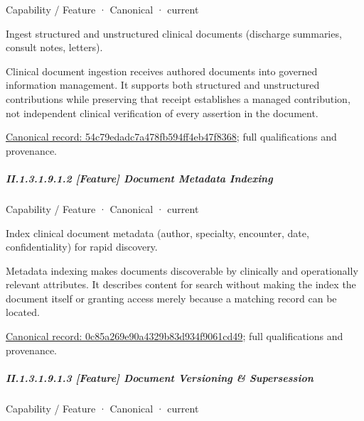 \label{element:54c79edadc7a478fb594ff4eb47f8368}
{\small Capability / Feature · Canonical · current}\par

Ingest structured and unstructured clinical documents (discharge summaries, consult notes, letters).



Clinical document ingestion receives authored documents into governed information management. It supports both structured and unstructured contributions while preserving that receipt establishes a managed contribution, not independent clinical verification of every assertion in the document.


{\footnotesize \href{../../../../../../../continuum/strategy/capability/feature/54c79edadc7a478fb594ff4eb47f8368.md}{Canonical record: 54c79edadc7a478fb594ff4eb47f8368}; full qualifications and provenance.}\par
\subparagraph*{II.1.3.1.9.1.2 [Feature] Document Metadata Indexing}
\label{navigation:II.1.3.1.9.1.2}

\label{element:0c85a269e90a4329b83d934f9061cd49}
{\small Capability / Feature · Canonical · current}\par

Index clinical document metadata (author, specialty, encounter, date, confidentiality) for rapid discovery.



Metadata indexing makes documents discoverable by clinically and operationally relevant attributes. It describes content for search without making the index the document itself or granting access merely because a matching record can be located.


{\footnotesize \href{../../../../../../../continuum/strategy/capability/feature/0c85a269e90a4329b83d934f9061cd49.md}{Canonical record: 0c85a269e90a4329b83d934f9061cd49}; full qualifications and provenance.}\par
\subparagraph*{II.1.3.1.9.1.3 [Feature] Document Versioning \& Supersession}
\label{navigation:II.1.3.1.9.1.3}

\label{element:c8e2e623dd4e4c3b8de6c3bfb8c2a3ee}
{\small Capability / Feature · Canonical · current}\par

